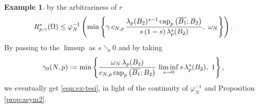 \documentclass{amsart}
\theoremstyle{definition}
\newtheorem{example}[theorem]{Example}
\numberwithin{equation}{section}
\begin{document}
\begin{example}

 by the arbitrariness of $r$ 
	\[
	R^s_{p,\gamma}(\Omega) \le \varphi_N^{-1}\left(\min\left\{\gamma\,c_{N,p}\,\frac{\lambda_{p}(B_2)^{s-1}\,{\rm cap}_p\left(\overline{B_1}; B_2\right)}{s\,(1-s)\,\lambda^s_p(B_2)},\,\, \omega_N\right\}\right).
	\]
	 By passing to the $\limsup$ as $s \searrow 0$ and by taking 
	 \begin{equation*}
	 	\gamma_0(N,p) := \min\left\{\frac{\omega_N\,\lambda_p(B_2)}{c_{N,p}\,{\rm cap}_p\left(\overline{B_1}; B_2\right)}\,\liminf_{s \to 0} s\,\lambda^s_p(B_2),\,\, 1\right\},
	 \end{equation*}
	 we eventually get \eqref{eqn:ex-tesi}, in light of the continuity of $\varphi_N^{-1}$ and Proposition \ref{prop:asym2}. 
\end{example}
\end{document}
